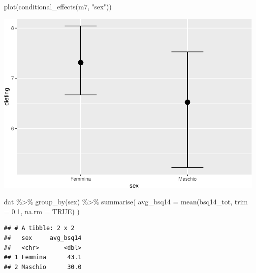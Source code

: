 \documentclass[
]{article}
\newenvironment{Shaded}{\begin{snugshade}}{\end{snugshade}}
\newcommand{\AttributeTok}[1]{\textcolor[rgb]{0.77,0.63,0.00}{#1}}
\newcommand{\CommentTok}[1]{\textcolor[rgb]{0.56,0.35,0.01}{\textit{#1}}}
\newcommand{\ConstantTok}[1]{\textcolor[rgb]{0.00,0.00,0.00}{#1}}
\newcommand{\FloatTok}[1]{\textcolor[rgb]{0.00,0.00,0.81}{#1}}
\newcommand{\FunctionTok}[1]{\textcolor[rgb]{0.00,0.00,0.00}{#1}}
\newcommand{\NormalTok}[1]{#1}
\newcommand{\SpecialCharTok}[1]{\textcolor[rgb]{0.00,0.00,0.00}{#1}}
\newcommand{\StringTok}[1]{\textcolor[rgb]{0.31,0.60,0.02}{#1}}
\begin{document}
\begin{Shaded}
\begin{Highlighting}[]
\FunctionTok{plot}\NormalTok{(}\FunctionTok{conditional\_effects}\NormalTok{(m7, }\StringTok{"sex"}\NormalTok{))}
\end{Highlighting}
\end{Shaded}

\includegraphics{050_quest_groups_files/figure-latex/unnamed-chunk-2-11.pdf}

\begin{Shaded}
\begin{Highlighting}[]
\NormalTok{dat }\SpecialCharTok{\%\textgreater{}\%} 
  \FunctionTok{group\_by}\NormalTok{(sex) }\SpecialCharTok{\%\textgreater{}\%} 
  \FunctionTok{summarise}\NormalTok{(}
    \AttributeTok{avg\_bsq14 =} \FunctionTok{mean}\NormalTok{(bsq14\_tot, }\AttributeTok{trim =} \FloatTok{0.1}\NormalTok{, }\AttributeTok{na.rm =} \ConstantTok{TRUE}\NormalTok{)}
\NormalTok{  )}
\end{Highlighting}
\end{Shaded}

\begin{verbatim}
## # A tibble: 2 x 2
##   sex     avg_bsq14
##   <chr>       <dbl>
## 1 Femmina      43.1
## 2 Maschio      30.0
\end{verbatim}

\begin{Shaded}
\end{Shaded}
\end{document}
